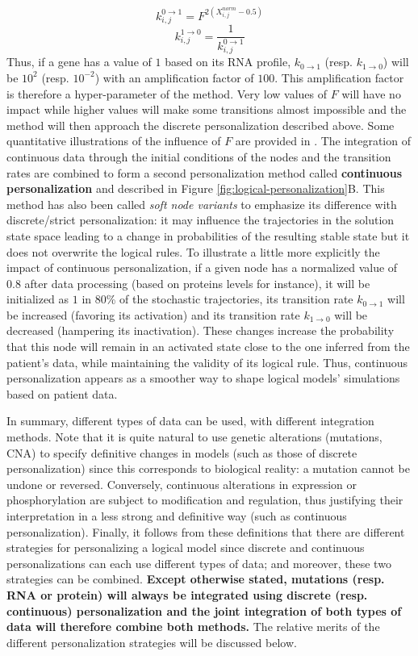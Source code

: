 \documentclass[a4paper,12pt,twoside,onecolumn,openright,final,oldfontcommands]{memoir}
\begin{document}
\[k^{0\rightarrow1}_{i,j}=F^{2(X^{norm}_{i,j}-0.5)}\]
\[k^{1\rightarrow0}_{i,j}=\dfrac{1}{k^{0\rightarrow1}_{i,j}}\] Thus, if
a gene has a value of \(1\) based on its RNA profile,
\(k_{0\rightarrow1}\) (resp. \(k_{1\rightarrow0}\)) will be \(10^2\)
(resp. \(10^{-2}\)) with an amplification factor of \(100\). This
amplification factor is therefore a hyper-parameter of the method. Very
low values of \(F\) will have no impact while higher values will make
some transitions almost impossible and the method will then approach the
discrete personalization described above. Some quantitative
illustrations of the influence of \(F\) are provided in
\citet{beal2019personalization}. The integration of continuous data
through the initial conditions of the nodes and the transition rates are
combined to form a second personalization method called
\textbf{continuous personalization} and described in Figure
\ref{fig:logical-personalization}B. This method has also been called
\emph{soft node variants} to emphasize its difference with
discrete/strict personalization: it may influence the trajectories in
the solution state space leading to a change in probabilities of the
resulting stable state but it does not overwrite the logical rules. To
illustrate a little more explicitly the impact of continuous
personalization, if a given node has a normalized value of \(0.8\) after
data processing (based on proteins levels for instance), it will be
initialized as \(1\) in 80\% of the stochastic trajectories, its
transition rate \(k_{0\rightarrow1}\) will be increased (favoring its
activation) and its transition rate \(k_{1\rightarrow0}\) will be
decreased (hampering its inactivation). These changes increase the
probability that this node will remain in an activated state close to
the one inferred from the patient's data, while maintaining the validity
of its logical rule. Thus, continuous personalization appears as a
smoother way to shape logical models' simulations based on patient data.

In summary, different types of data can be used, with different
integration methods. Note that it is quite natural to use genetic
alterations (mutations, CNA) to specify definitive changes in models
(such as those of discrete personalization) since this corresponds to
biological reality: a mutation cannot be undone or reversed. Conversely,
continuous alterations in expression or phosphorylation are subject to
modification and regulation, thus justifying their interpretation in a
less strong and definitive way (such as continuous personalization).
Finally, it follows from these definitions that there are different
strategies for personalizing a logical model since discrete and
continuous personalizations can each use different types of data; and
moreover, these two strategies can be combined. \textbf{Except otherwise
stated, mutations (resp. RNA or protein) will always be integrated using
discrete (resp. continuous) personalization and the joint integration of
both types of data will therefore combine both methods.} The relative
merits of the different personalization strategies will be discussed
below.
\end{document}
